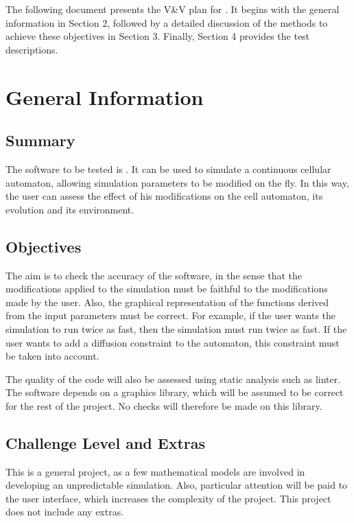 \documentclass[12pt, titlepage]{article}
\begin{document}
The following document presents the V\&V plan for \progname. It begins with the general information in Section 2, followed by a detailed discussion of the methods to achieve these objectives in Section 3. Finally, Section 4 provides the test descriptions.

\section{General Information}

\subsection{Summary}

The software to be tested is \progname. It can be used to simulate a continuous cellular automaton, allowing simulation parameters to be modified on the fly. 
In this way, the user can assess the effect of his modifications on the cell automaton, its evolution and its environment.

\subsection{Objectives}

The aim is to check the accuracy of the software, in the sense that the modifications applied to the simulation must be faithful to the modifications made by the user. 
Also, the graphical representation of the functions derived from the input parameters must be correct. 
For example, if the user wants the simulation to run twice as fast, then the simulation must run twice as fast.
If the user wants to add a diffusion constraint to the automaton, this constraint must be taken into account.

The quality of the code will also be assessed using static analysis such as linter.
The software depends on a graphics library, which will be assumed to be correct for the rest of the project. No checks will therefore be made on this library.

\subsection{Challenge Level and Extras}

This is a general project, as a few mathematical models are involved in developing an unpredictable simulation.
Also, particular attention will be paid to the user interface, which increases the complexity of the project.
This project does not include any extras.
\end{document}
